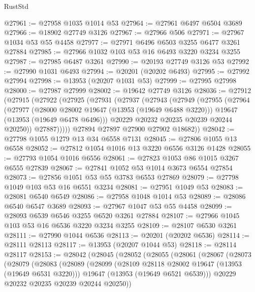 \begin{lexlean}{RustStd}
\begin{coremodule}
@27961 := @27958 @1035 @1014 @53
@27964 := @27961 @6497 @6504 @3689
@27966 := @18902 @27749 @3126
@27967 := @27966 @506
@27971 := @27967 @1034 @53 @55 @4458
@27977 := @27971 @6496 @6503 @3255 @6477 @3261 @27884
@27985 := @27966 @1032 @103 @53 @16 @6493 @3220 @3234 @3255
@27987 := @27985 @6487 @3261
@27990 := @20193 @27749 @3126 @53
@27992 := @27990 @1031 @6493
@27994 := @20201 (@20202 @6493)
@27995 := @27992 @27994
@27998 := @13953 (@20207 @1031 @53)
@27999 := @27995 @27998
@28000 := @27987 @27999
@28002 := @19642 @27749 @3126
@28036 := @27912
    (@27915
      (@27922
        (@27925
          (@27931
            (@27937
              (@27943
                (@27949
                  (@27955
                    (@27964
                      (@27977
                        (@28000 @28002 @19647 (@13953 (@19649 @6488 @3220)))
                        @19647
                        (@13953 (@19649 @6478 @6496)))
                      @20229
                      @20232
                      @20235
                      @20239
                      @20244
                      @20250))
                  @27887)))))
        @27894
        @27897
        @27900
        @27902
        @18682))
@28042 := @27798 @1055 @1279 @13 @34 @6558 @7131
@28045 := @27806 @1055 @13 @6558
@28052 := @27812 @1054 @1016 @13 @3220 @6556 @3126 @1428
@28055 := @27793 @1054 @1016 @6556
@28061 := @27823 @1053 @86 @1015 @3267 @6555 @27839
@28067 := @27841 @1052 @53 @1014 @3673 @6554 @27854
@28073 := @27856 @1051 @53 @55 @3783 @6553 @27869
@28079 := @27798 @1049 @103 @53 @16 @6551 @3234
@28081 := @27951 @1049 @53
@28083 := @28081 @6540 @6549
@28086 := @27958 @1048 @1014 @53
@28089 := @28086 @6540 @6547 @3689
@28093 := @27967 @1047 @53 @55 @4458
@28099 := @28093 @6539 @6546 @3255 @6520 @3261 @27884
@28107 := @27966 @1045 @103 @53 @16 @6536 @3220 @3234 @3255
@28109 := @28107 @6530 @3261
@28111 := @27990 @1044 @6536
@28113 := @20201 (@20202 @6536)
@28114 := @28111 @28113
@28117 := @13953 (@20207 @1044 @53)
@28118 := @28114 @28117
@28153 := @28042
    (@28045
      (@28052
        (@28055
          (@28061
            (@28067
              (@28073
                (@28079
                  (@28083
                    (@28089
                      (@28099
                        (@28109 @28118 @28002 @19647 (@13953 (@19649 @6531 @3220)))
                        @19647
                        (@13953 (@19649 @6521 @6539)))
                      @20229
                      @20232
                      @20235
                      @20239
                      @20244
                      @20250))

\end{coremodule}
\end{lexlean}

